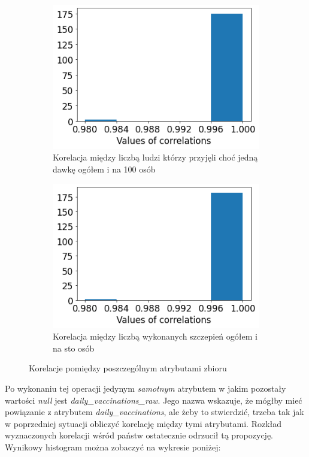 \documentclass[12pt, oneside, openany]{article}
\begin{document}
\begin{figure}
  \begin{subfigure}[t]{.45\textwidth}
    \centering
    \includegraphics[width=\linewidth]{../img/null_column_diff3.png}
    \caption{Korelacja między liczbą ludzi którzy przyjęli choć jedną dawkę ogółem i na 100 osób}
  \end{subfigure}
  \hfill
  \begin{subfigure}[t]{.45\textwidth}
    \centering
    \includegraphics[width=\linewidth]{../img/null_column_diff4.png}
    \caption{Korelacja między liczbą wykonanych szczepień ogółem i na sto osób}
  \end{subfigure}
  \caption{Korelacje pomiędzy poszczególnym atrybutami zbioru}
\label{Rys:kor}
\end{figure}


Po wykonaniu tej operacji jedynym \textit{samotnym} atrybutem w jakim pozostały wartości \textit{null} jest \textit{daily\_vaccinations\_raw}. Jego nazwa wskazuje, że mógłby mieć powiązanie z atrybutem \textit{daily\_vaccinations}, ale żeby to stwierdzić, trzeba tak jak w poprzedniej sytuacji obliczyć korelację między tymi atrybutami. Rozkład wyznaczonych korelacji wśród państw ostatecznie odrzucił tą propozycję. Wynikowy histogram można zobaczyć na wykresie poniżej:
\end{document}
